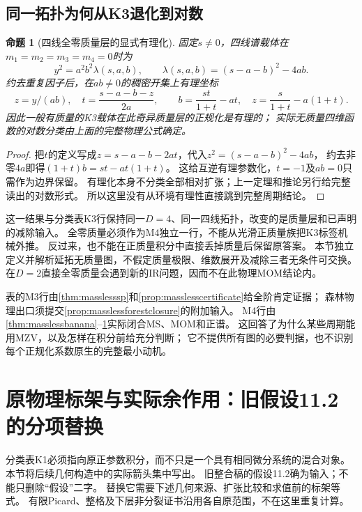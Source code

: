 \documentclass[11pt,a4paper]{ctexart}
\theoremstyle{cnplain}\newtheorem{theorem}{定理}[section]
\newtheorem{proposition}[theorem]{命题}
\theoremstyle{definition}\newtheorem{definition}[theorem]{定义}
\theoremstyle{remark}\newtheorem{remark}[theorem]{注}
\begin{document}
\subsection{同一拓扑为何从K3退化到对数}
\begin{proposition}[四线全零质量层的显式有理化]\label{prop:masslessdegeneration}
固定$s\ne0$，四线谱载体在$m_1=m_2=m_3=m_4=0$时为
\[
 y^2=a^2b^2\lambda(s,a,b),\qquad
 \lambda(s,a,b)=(s-a-b)^2-4ab.
\]
约去重复因子后，在$ab\ne0$的稠密开集上有理坐标
\[
 z=y/(ab),\quad t=\frac{s-a-b-z}{2a},\qquad
 b=\frac{st}{1+t}-at,\quad z=\frac{s}{1+t}-a(1+t).
\]
因此一般有质量的K3载体在此奇异质量层的正规化是有理的；
实际无质量四维函数的对数分类由上面的完整物理公式确定。
\end{proposition}
\begin{proof}
把$t$的定义写成$z=s-a-b-2at$，代入$z^2=(s-a-b)^2-4ab$，
约去非零$4a$即得$(1+t)b=st-at(1+t)$。
这给互逆有理参数化，$t=-1$及$a b=0$只需作为边界保留。
有理化本身不分类全部相对扩张；上一定理和推论另行给完整读出的对数形式。
所以这里没有从环境有理性直接跳到完整周期结论。
\end{proof}

这一结果与分类表K3行保持同一$D=4$、同一四线拓扑，改变的是质量层和已声明的减除输入。
全零质量必须作为M4独立一行，不能从光滑正质量族把K3标签机械外推。
反过来，也不能在正质量积分中直接丢掉质量后保留原答案。
本节独立定义并解析延拓无质量图，不假定质量极限、维数展开及减除三者无条件可交换。
在$D=2$直接全零质量会遇到新的IR问题，因而不在此物理MOM结论内。

表的M3行由\ref{thm:masslesssp}和\ref{prop:masslesscertificate}给全阶肯定证据；
森林物理出口须提交\ref{prop:masslessforestclosure}的附加输入。
M4行由\ref{thm:masslessbanana}--\ref{prop:masslessdegeneration}实际闭合MS、MOM和正谱。
这回答了为什么某些周期能用MZV，以及怎样在积分前给充分判断；
它不提供所有图的必要判据，也不识别每个正规化系数原生的完整最小动机。

\section{原物理标架与实际余作用：旧假设11.2的分项替换}
\label{sec:actualframebridge}
分类表K1必须指向原正参数积分，而不只是一个具有相同微分系统的混合对象。
本节将后续几何构造中的实际箭头集中写出。
旧整合稿的假设11.2确为输入；不能只删除“假设”二字。
替换它需要下述几何来源、扩张比较和求值前的标架等式。
有限Picard、整格及下层非分裂证书沿用各自原范围，不在这里重复计算。
\end{document}
